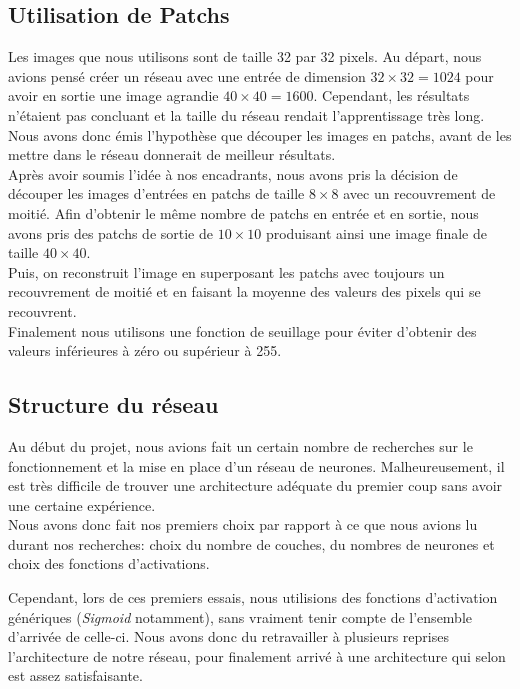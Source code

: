 \documentclass[12pt, a4paper]{article}
\begin{document}
	\subsection{Utilisation de Patchs}
Les images que nous utilisons sont de taille 32 par 32 pixels. Au départ, nous avions pensé créer un réseau avec une entrée de dimension $32 \times 32 = 1024$ pour avoir en sortie une image agrandie $40 \times 40 = 1600$. Cependant, les résultats n'étaient pas concluant et la taille du réseau rendait l'apprentissage très long. Nous avons donc émis l'hypothèse que découper les images en patchs, avant de les mettre dans le réseau donnerait de meilleur résultats.
\\

Après avoir soumis l'idée à nos encadrants, nous avons pris la décision de découper les images d'entrées en patchs de taille $8 \times 8$ avec un recouvrement de moitié. Afin d'obtenir le même nombre de patchs en entrée et en sortie, nous avons pris des patchs de sortie de $10 \times 10$ produisant ainsi une image finale de taille $40 \times 40$.\\ Puis, on reconstruit l'image en superposant les patchs avec toujours un recouvrement de moitié et en faisant la moyenne des valeurs des pixels qui se recouvrent. 
\\

Finalement nous utilisons une fonction de seuillage pour éviter d'obtenir des valeurs inférieures à zéro ou supérieur à 255.

	\subsection{Structure du réseau}
Au début du projet, nous avions fait un certain nombre de recherches sur le fonctionnement et la mise en place d'un réseau de neurones. Malheureusement, il est très difficile de trouver une architecture adéquate du premier coup sans avoir une certaine expérience. \\
Nous avons donc fait nos premiers choix par rapport à ce que nous avions lu durant nos recherches: choix du nombre de couches, du nombres de neurones et choix des fonctions d'activations. 

Cependant, lors de ces premiers essais, nous utilisions des fonctions d'activation génériques (\emph{Sigmoid} notamment), sans vraiment tenir compte de l'ensemble d'arrivée de celle-ci. 
Nous avons donc du retravailler à plusieurs reprises l'architecture de notre réseau, pour finalement arrivé à une architecture qui selon est assez satisfaisante. 
\end{document}
